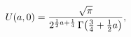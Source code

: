 \[\mathop{U\/}\nolimits\!\left(a,0\right)=\frac{\sqrt{\pi}}{2^{\frac{1}{2}a+%
\frac{1}{4}}\mathop{\Gamma\/}\nolimits\!\left(\frac{3}{4}+\frac{1}{2}a\right)},\]